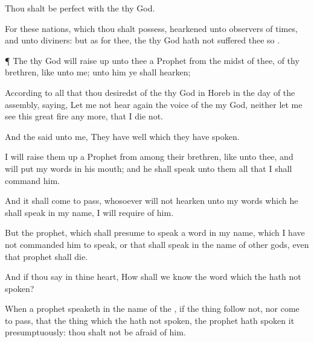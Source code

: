 {Thou shalt be
perfect with the
{} thy
God.

For these
nations, which thou shalt
possess,
hearkened unto observers of
times, and unto
diviners: but as for thee, the
{} thy
God hath not
suffered thee so
{}.


\par }{\PP {}¶ The
{} thy
God will raise
up unto thee a
Prophet from the
midst of thee, of thy
brethren, like unto me; unto him ye shall
hearken;

According to all that thou
desiredst of the
{} thy
God in
Horeb in the
day of the
assembly,
saying, Let me not
hear
again the
voice of the
{} my
God, neither let me
see this
great
fire any more, that I
die not.

And the
{}
said unto me, They have
well
{} which they have
spoken.

I will raise them
up a
Prophet from
among their
brethren, like unto thee, and will
put my
words in his
mouth; and he shall
speak unto them all that I shall
command him.

And it shall come to pass,
{}
whosoever will not
hearken unto my
words which he shall
speak in my
name, I will
require
{} of him.

But the
prophet, which shall
presume to
speak a
word in my
name, which I have not
commanded him to
speak, or that shall
speak in the
name of
other
gods, even that
prophet shall
die.

And if thou
say in thine
heart, How shall we
know the
word which the
{} hath not
spoken?

When a
prophet
speaketh in the
name of the
{}, if the
thing follow not, nor come to
pass, that
{} the
thing which the
{} hath not
spoken,
{} the
prophet hath
spoken it
presumptuously: thou shalt not be
afraid of him.




\par }
